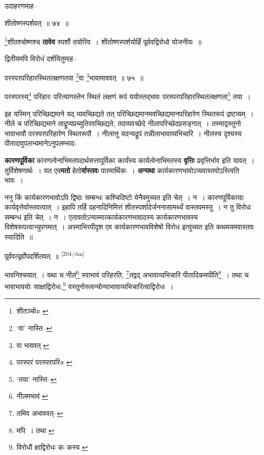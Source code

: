 \documentclass[article,12pt,a4paper]{memoir}
\begin{document}
	  \pstart उदाहरणमाह--
	\pend
       

	  \pstart शीतोष्णस्पर्शवत् ॥ ७४ ॥
	\pend
       

	  \pstart \footnote{शीतञ्चो० \cite{dp-msD}}शीतश्चोष्णश्च \textbf{तावेव} स्पर्शौ तयोरिव । शीतोष्णस्पर्शयोर्हिं पूर्ववद्विरोधो योजनीयः ॥
	\pend
       

	  \pstart द्वितीयमपि विरोधं दर्शयितुमाह--
	\pend
       

	  \pstart परस्परपरिहारस्थितलक्षणतया \footnote{‘वा’ नास्ति--\cite{dp-msC}}वा \footnote{वा भाववत् \cite{dp-msB} \cite{dp-edP} \cite{dp-edH}}भावामाववत् ॥ ७५ ॥
	\pend
       

	  \pstart परस्परस्य\footnote{परस्परं \cite{dp-msA} \cite{dp-msB} \cite{dp-edP} परस्परपरि० \cite{dp-edH} \cite{dp-edE}} परिहारः परित्यागस्तेन स्थितं लक्षणं रूपं ययोस्तद्भावः परस्परपरिहारस्थितलक्षणता\footnote{‘तया’ नास्ति--\cite{dp-msC}} तया ।
	\pend
       

	  \pstart इह यस्मिन् परिच्छिद्यमाने यद् व्यवच्छिद्यते तत् परिच्छिद्यमानमवच्छिद्यमानपरिहारेण स्थितरूपं द्रष्टव्यम् । नीले च परिच्छिद्यमाने ताद्रूप्यप्रच्युतिरवच्छिद्यते, तदव्यवच्छेदे नीलापरिच्छेदप्रसङ्गात् । तस्माद्वस्तुनो भावाभावौ परस्परपरिहारेण स्थितरूपौ । नीलात्तु यदन्यद्रूपं तन्नीलाभावाव्यभिचारि । नीलस्य दृश्यस्य पीतादावुपलभ्यमानेऽनुपलम्भाद-
	\pend
      

	  \pstart \textbf{कारणपूर्विका} कारणत्वेनाभिमतपदार्थसत्तापूर्विका कार्यंस्य कार्यत्वेनाभिमतस्य \textbf{वृत्तिः} प्रवृत्तिर्भाव इति यावत् । तुर्विशेषणार्थः । यत एव\textbf{मतो} हेतो\textbf{र्वास्तवः} पारमार्थिकः । \textbf{अन्यथा} कार्यकारणभावोऽप्यवास्तवोऽस्त्विति भावः ।
	\pend
      

	  \pstart ननु किं कार्यकारणभावोऽपि द्विष्ठः सम्बन्धः कश्चिदिष्टो येनैवमुच्यत इति चेत् । न । कारणपूर्विकायाः कार्यवृत्तेर्वास्तवत्वात् । इहापि तर्हि दहनादिनिमित्तं शीतस्पर्शादेर्जननासामर्थ्यं वास्तवमस्तु । न तु विरोधः सम्बन्ध इति चेत् । न । एतावतोऽन्यस्मात्कार्यकारणभावादस्य कार्यकारणभावस्य विशेषरूपत्वाभ्युपगमात् । अस्माभिरपीदृश एव कार्यकारणभावविशेषो विरोध इत्युच्यत इति कथमयमवास्तवः स्यादिति ॥
	\pend
      

	  \pstart पूर्वंवत्पूर्वोपदर्शितवत् ॥
	\pend
      \leavevmode\textsuperscript{\rmlatinfont\tiny [204/dm]}

	  \pstart भावनिश्चयात् । यथा च नीलं\footnote{नीलमभावं \cite{dp-msA} \cite{dp-msB} \cite{dp-msC} \cite{dp-edP} \cite{dp-edH}} स्वाभावं परिहरति, \footnote{तमिव अभाववत्--\cite{dp-msD-n}}तद्वद् अभावाव्यभिचारि पीतादिकमपीति\footnote{मपि । तथा \cite{dp-msA} \cite{dp-msB} \cite{dp-edP} \cite{dp-edH} \cite{dp-edE} \cite{dp-edN}} । तथा च भावाभावयोः साक्षाद्विरोधः,\footnote{विरोधौ \cite{dp-msA} क्षाद्विरोधः कः कस्य \cite{dp-msB}} वस्तुनोस्त्वन्योन्याभावाव्यभिचारित्वाद्विरोधः ।
	\pend
       
\end{document}

